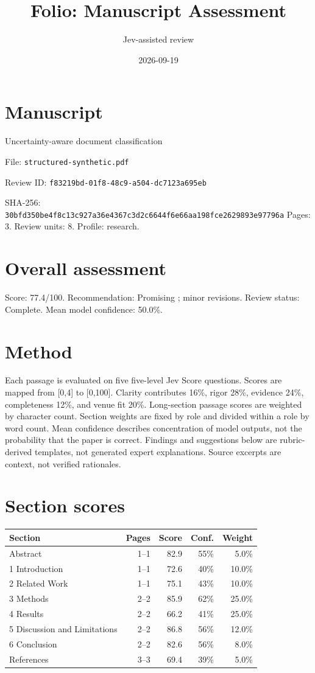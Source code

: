 \documentclass[11pt]{article}
\title{Folio: Manuscript Assessment}
\author{Jev-assisted review}
\date{2026-09-19}
\begin{document}
\maketitle
\section{Manuscript}
Uncertainty-aware document classification
\par File: \texttt{structured-synthetic.pdf}
\par Review ID: \texttt{f83219bd-01f8-48c9-a504-dc7123a695eb}
\par SHA-256: \texttt{30bfd350be4f8c13c927a36e4367c3d2}\allowbreak\texttt{c6644f6e66aa198fce2629893e97796a}
Pages: 3. Review units: 8. Profile: research.
\section{Overall assessment}
Score: 77.4/100. Recommendation: Promising ; minor revisions.
Review status: Complete. Mean model confidence: 50.0\%.
\section{Method}
Each passage is evaluated on five five-level Jev Score questions. Scores are mapped from [0,4] to [0,100]. Clarity contributes 16\%, rigor 28\%, evidence 24\%, completeness 12\%, and venue fit 20\%. Long-section passage scores are weighted by character count. Section weights are fixed by role and divided within a role by word count. Mean confidence describes concentration of model outputs, not the probability that the paper is correct. Findings and suggestions below are rubric-derived templates, not generated expert explanations. Source excerpts are context, not verified rationales.
\section{Section scores}
\begin{longtable}{p{}rrrr}
\toprule Section & Pages & Score & Conf. & Weight \\ \midrule\endhead
Abstract & 1--1 & 82.9 & 55\% & 5.0\% \\
1 Introduction & 1--1 & 72.6 & 40\% & 10.0\% \\
2 Related Work & 1--1 & 75.1 & 43\% & 10.0\% \\
3 Methods & 2--2 & 85.9 & 62\% & 25.0\% \\
4 Results & 2--2 & 66.2 & 41\% & 25.0\% \\
5 Discussion and Limitations & 2--2 & 86.8 & 56\% & 12.0\% \\
6 Conclusion & 2--2 & 82.6 & 56\% & 8.0\% \\
References & 3--3 & 69.4 & 39\% & 5.0\% \\
\bottomrule\end{longtable}
\end{document}
